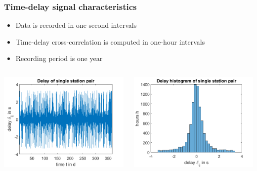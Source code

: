 \documentclass{beamer}
\begin{document}
\begin{frame}
\frametitle{Time-delay signal characteristics}
\begin{itemize}
\item Data is recorded in one second intervals
\item Time-delay cross-correlation is computed in one-hour intervals
\item Recording period is one year
\end{itemize}

\begin{columns}
\includegraphics[width=\textwidth]{../figures/delayevolutionovertimeforonestation2_presentation.png}

\includegraphics[width=\textwidth]{../figures/delayevolutionovertimeforonestation_presentation.png}
\end{columns}
\end{frame}
\end{document}
